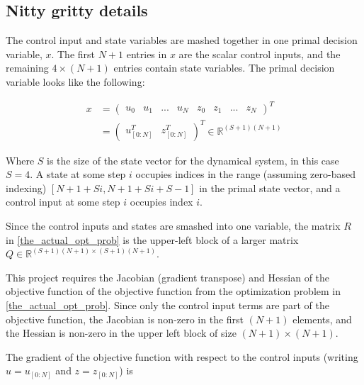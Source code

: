 \documentclass{exam}
\begin{document}
\pagebreak

\begin{multicols}{2}
\subsection{Nitty gritty details}

The control input and state variables are mashed together in one primal decision variable, $x$. The first $N + 1$ entries in $x$ are the scalar control inputs, and the remaining $4 \times (N + 1)$ entries contain state variables. The primal decision variable looks like the following:

\begin{equation}
    \begin{aligned}
        x &= \begin{pmatrix}
        u_0 &
        u_1 &
        ... &
        u_N &
        z_0 &
        z_1 &
        ... &
        z_N
    \end{pmatrix}^T \\
    &= \begin{pmatrix}
        u_{[0:N]}^T &
        z_{[0:N]}^T
    \end{pmatrix}^T \in \mathbb{R}^{(S + 1)(N + 1)}
    \end{aligned}
\end{equation}

Where $S$ is the size of the state vector for the dynamical system, in this case $S = 4$. A state at some step $i$ occupies indices in the range (assuming zero-based indexing) $[N + 1 + Si, N + 1 + Si + S - 1]$ in the primal state vector, and a control input at some step $i$ occupies index $i$.

Since the control inputs and states are smashed into one variable, the matrix $R$ in \eqref{the_actual_opt_prob} is the upper-left block of a larger matrix $Q \in \mathbb{R}^{(S + 1)(N + 1) \times (S + 1)(N + 1)}$.

This project requires the Jacobian (gradient transpose) and Hessian of the objective function of the objective function from the optimization problem in \eqref{the_actual_opt_prob}. Since only the control input terms are part of the objective function, the Jacobian is non-zero in the first $(N + 1)$ elements, and the Hessian is non-zero in the upper left block of size $(N + 1) \times (N + 1)$.

The gradient of the objective function with respect to the control inputs (writing $u = u_{[0:N]}$ and $z = z_{[0:N]}$) is


\end{multicols}
\end{document}
